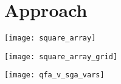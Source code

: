 \graphicspath{{images_low_res/}}
\section{Approach}
\label{sec:approach}


\begin{Figure}
  \centering
  \texttt{[image: square\_array]}
\end{Figure}

\begin{Figure}
  \centering
  \texttt{[image: square\_array\_grid]}
\end{Figure}

\begin{Figure}
  \centering
  \texttt{[image: qfa\_v\_sga\_vars]}
\end{Figure}


